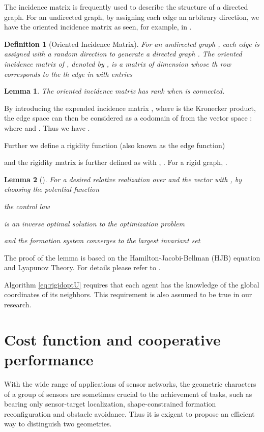 \documentclass[times]{rncauth}
\newtheorem{lem}{Lemma}[section]
\newtheorem{defn}{Definition}[section]
\begin{document}
The incidence matrix is frequently used to describe the structure of
a directed graph. For an  undirected graph, by assigning each edge
an arbitrary direction, we have the oriented incidence matrix as
seen, for example, in \cite{Diestel10}.
\begin{defn}[Oriented Incidence Matrix]
For an undirected graph , each edge is assigned with a
random direction to generate a directed graph .
The oriented incidence matrix of , denoted by , is a matrix
of dimension  whose th row corresponds to the
th edge in  with entries

\end{defn}
\begin{lem}\label{lemma:rankofH}
  The oriented incidence matrix  has rank  when  is connected.
\end{lem}


  By introducing the expended incidence matrix , where  is the Kronecker product, the edge space 
   can then be considered as a
  codomain of  from the vector space :
   where  and . Thus we have .

Further we define a rigidity function\cite{Yu09minimalPersistent}
(also known as the edge function\cite{Dorfler09cooperativeBehavior})

and the rigidity matrix is further defined as
 with
, . For a
rigid graph, .




\begin{lem}[\cite{Dorfler09cooperativeBehavior}]\label{lemma:dorfler}
For a desired relative realization  over  and
the vector  with
, by choosing the potential function

the control law

is an \emph{inverse} optimal solution to the optimization problem

and the formation system converges to the largest  invariant set

\end{lem}
The proof of the lemma is based on the Hamilton-Jacobi-Bellman (HJB)
equation and Lyapunov Theory. For details please refer to
\cite{Dorfler09cooperativeBehavior}.






Algorithm \eqref{eq:rigidoptU} requires that each agent has the
knowledge of the global coordinates of its neighbors. This
requirement is also assumed to be true in our research.

\section{Cost function and cooperative performance}
With the wide range of applications of sensor networks, the geometric characters of  a group of sensors are sometimes crucial to the achievement of tasks, such as bearing only sensor-target localization, shape-constrained formation reconfiguration and obstacle avoidance. Thus it is exigent to propose an  efficient way to distinguish two geometries.
\end{document}
